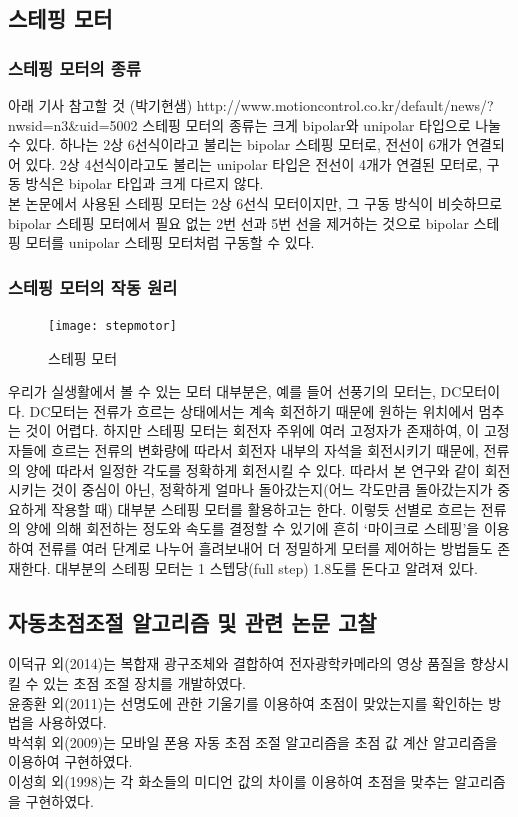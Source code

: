 \subsection{스테핑 모터}

\subsubsection{스테핑 모터의 종류}

아래 기사 참고할 것 (박기현샘)
http://www.motioncontrol.co.kr/default/news/?nwsid=n3&uid=5002
스테핑 모터의 종류는 크게 bipolar와 unipolar 타입으로 나눌 수 있다. 하나는 2상 6선식이라고 불리는 bipolar 스테핑 모터로, 전선이 6개가 연결되어 있다. 2상 4선식이라고도 불리는 unipolar 타입은 전선이 4개가 연결된 모터로, 구동 방식은 bipolar 타입과 크게 다르지 않다.\\
본 논문에서 사용된 스테핑 모터는 2상 6선식 모터이지만, 그 구동 방식이 비슷하므로 bipolar 스테핑 모터에서 필요 없는 2번 선과 5번 선을 제거하는 것으로 bipolar 스테핑 모터를 unipolar 스테핑 모터처럼 구동할 수 있다.

\subsubsection{스테핑 모터의 작동 원리}

\begin{figure}
	\texttt{[image: stepmotor]}
	\caption{스테핑 모터}
	\label{fig:stepmotor}
\end{figure}
우리가 실생활에서 볼 수 있는 모터 대부분은, 예를 들어 선풍기의 모터는, DC모터이다. DC모터는 전류가 흐르는 상태에서는 계속 회전하기 때문에 원하는 위치에서 멈추는 것이 어렵다. 하지만 스테핑 모터는 회전자 주위에 여러 고정자가 존재하여, 이 고정자들에 흐르는 전류의 변화량에 따라서 회전자 내부의 자석을 회전시키기 때문에, 전류의 양에 따라서 일정한 각도를 정확하게 회전시킬 수 있다. 따라서 본 연구와 같이 회전시키는 것이 중심이 아닌, 정확하게 얼마나 돌아갔는지(어느 각도만큼 돌아갔는지가 중요하게 작용할 때) 대부분 스테핑 모터를 활용하고는 한다. 이렇듯 선별로 흐르는 전류의 양에 의해 회전하는 정도와 속도를 결정할 수 있기에 흔히 ‘마이크로 스테핑’을 이용하여 전류를 여러 단계로 나누어 흘려보내어 더 정밀하게 모터를 제어하는 방법들도 존재한다. 대부분의 스테핑 모터는 1 스텝당(full step) 1.8도를 돈다고 알려져 있다.

\subsection{자동초점조절 알고리즘 및 관련 논문 고찰}

이덕규 외(2014)는 복합재 광구조체와 결합하여 전자광학카메라의 영상 품질을 향상시킬 수 있는 초점 조절 장치를 개발하였다.\cite{leedukgu2014}\\
윤종환 외(2011)는 선명도에 관한 기울기를 이용하여 초점이 맞았는지를 확인하는 방법을 사용하였다.\cite{yunjonghwan2011lcd}\\
박석휘 외(2009)는 모바일 폰용 자동 초점 조절 알고리즘을 초점 값 계산 알고리즘을 이용하여 구현하였다.\cite{parksukhui2009Median}\\
이성희 외(1998)는 각 화소들의 미디언 값의 차이를 이용하여 초점을 맞추는 알고리즘을 구현하였다.\cite{leeseonghee1998Median}
